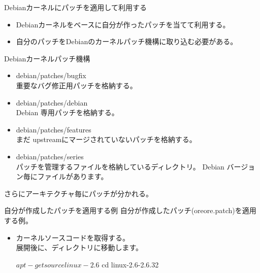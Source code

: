\begin{frame}[containsverbatim]{Debianカーネルにパッチを適用して利用する}

\begin{itemize}
\item Debianカーネルをベースに自分が作ったパッチを当てて利用する。
\item 自分のパッチをDebianのカーネルパッチ機構に取り込む必要がある。
\end{itemize}
\end{frame}

\begin{frame}[containsverbatim]{Debianカーネルパッチ機構}

\begin{itemize}
\item debian/patches/bugfix\\
重要なバグ修正用パッチを格納する。

\item debian/patches/debian\\
Debian 専用パッチを格納する。

\item debian/patches/features\\
まだ upstreamにマージされていないパッチを格納する。

\item debian/patches/series\\
パッチを管理するファイルを格納しているディレクトリ。
Debian バージョン毎にファイルがあります。

\end{itemize}
さらにアーキテクチャ毎にパッチが分かれる。
\end{frame}

\begin{frame}[containsverbatim]{自分が作成したパッチを適用する例}
自分が作成したパッチ(oreore.patch)を適用する例。
\begin{itemize}
\item カーネルソースコードを取得する。\\
展開後に、ディレクトリに移動します。
\begin{commandline}
$ apt-get source linux-2.6
$ cd linux-2.6-2.6.32
\end{commandline}

\end{itemize}
\end{frame}

